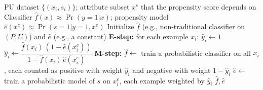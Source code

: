 \documentclass{article}
\begin{document}
\begin{algorithm}[!h]
\renewcommand{\algorithmicrequire}{\textbf{Input:}} %
\renewcommand{\algorithmicensure}{\textbf{Output:}} %
	\caption{SAR-EM} %
	\begin{algorithmic}[1] %
	    \REQUIRE
	    PU dataset $\{(x_i,s_i)\}$; attribute subset $x^{e}$ that the propensity score depends on
	    \ENSURE
	    Classifier $\hat{f}(x)\approx\Pr(y=1|x)$; propensity model $\hat{e}(x^{e})\approx\Pr(s=1|y=1,x^{e})$
	    \STATE Initialize $\hat{f}$ (e.g., non-traditional classifier on $(P,U)$) and $\hat{e}$ (e.g., a constant)
	    \STATE \textbf{E-step:} for each example $x_i$:
	    \STATE $\hat{y}_i\leftarrow 1$ %
	    \ELSE
	    \STATE $\hat{y}_i\leftarrow \dfrac{\hat{f}(x_i)\,(1-\hat{e}(x_i^{e}))}{1-\hat{f}(x_i)\,\hat{e}(x_i^{e})}$ %
	    \ENDIF
	    \STATE \textbf{M-step:}
	    \STATE $\hat{f}\leftarrow$ train a probabilistic classifier on all $x_i$, each counted as positive with weight $\hat{y}_i$ and negative with weight $1-\hat{y}_i$
	    \STATE $\hat{e}\leftarrow$ train a probabilistic model of $s$ on $x_i^{e}$, each example weighted by $\hat{y}_i$ %
	    \ENDWHILE
		\RETURN $\hat{f},\hat{e}$
	\end{algorithmic}
\end{algorithm}
\end{document}
